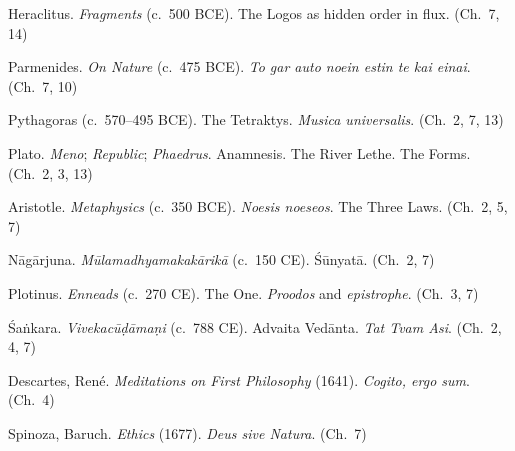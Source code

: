 \documentclass[10pt, openany, oneside]{book}
\renewcommand{\footnotesize}{\fontsize{8.5}{11}\selectfont}
\begin{document}
{\footnotesize

\begin{english}
\noindent Heraclitus. \textit{Fragments} (c.\ 500 BCE). The Logos as hidden order in flux. (Ch.\ 7, 14)

\vspace{0.3em}

\noindent Parmenides. \textit{On Nature} (c.\ 475 BCE). \textit{To gar auto noein estin te kai einai}. (Ch.\ 7, 10)

\vspace{0.3em}

\noindent Pythagoras (c.\ 570--495 BCE). The Tetraktys. \textit{Musica universalis}. (Ch.\ 2, 7, 13)

\vspace{0.3em}

\noindent Plato. \textit{Meno}; \textit{Republic}; \textit{Phaedrus}. Anamnesis. The River Lethe. The Forms. (Ch.\ 2, 3, 13)

\vspace{0.3em}

\noindent Aristotle. \textit{Metaphysics} (c.\ 350 BCE). \textit{Noesis noeseos}. The Three Laws. (Ch.\ 2, 5, 7)

\vspace{0.3em}

\noindent N\={a}g\={a}rjuna. \textit{M\={u}lamadhyamakak\={a}rik\={a}} (c.\ 150 CE). \'{S}\={u}nyat\={a}. (Ch.\ 2, 7)

\vspace{0.3em}

\noindent Plotinus. \textit{Enneads} (c.\ 270 CE). The One. \textit{Proodos} and \textit{epistrophe}. (Ch.\ 3, 7)

\vspace{0.3em}

\noindent \'{S}a\.{n}kara. \textit{Vivekac\={u}\d{d}\={a}ma\d{n}i} (c.\ 788 CE). Advaita Ved\={a}nta. \textit{Tat Tvam Asi}. (Ch.\ 2, 4, 7)

\vspace{0.3em}

\noindent Descartes, Ren\'{e}. \textit{Meditations on First Philosophy} (1641). \textit{Cogito, ergo sum}. (Ch.\ 4)

\vspace{0.3em}

\noindent Spinoza, Baruch. \textit{Ethics} (1677). \textit{Deus sive Natura}. (Ch.\ 7)

\vspace{0.3em}


\end{english}}
\end{document}
